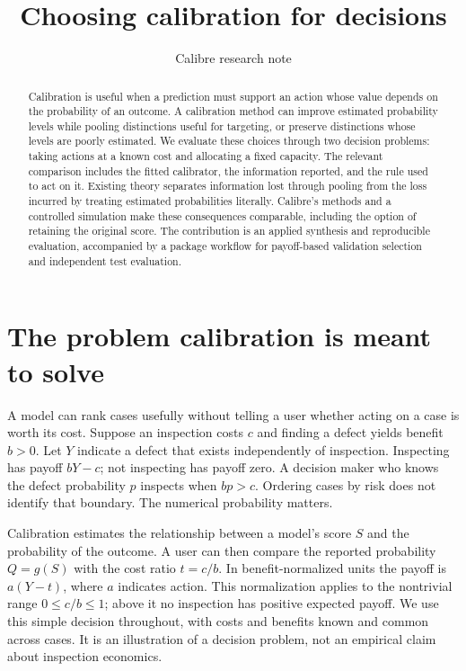 \documentclass[11pt]{article}
\title{Choosing calibration for decisions}
\author{Calibre research note}
\date{}
\begin{document}
\maketitle
\begin{abstract}
Calibration is useful when a prediction must support an action whose value depends on the probability of an outcome. A calibration method can improve estimated probability levels while pooling distinctions useful for targeting, or preserve distinctions whose levels are poorly estimated. We evaluate these choices through two decision problems: taking actions at a known cost and allocating a fixed capacity. The relevant comparison includes the fitted calibrator, the information reported, and the rule used to act on it. Existing theory separates information lost through pooling from the loss incurred by treating estimated probabilities literally. Calibre's methods and a controlled simulation make these consequences comparable, including the option of retaining the original score. The contribution is an applied synthesis and reproducible evaluation, accompanied by a package workflow for payoff-based validation selection and independent test evaluation.
\end{abstract}

\section{The problem calibration is meant to solve}
A model can rank cases usefully without telling a user whether acting on a case is worth its cost. Suppose an inspection costs $c$ and finding a defect yields benefit $b>0$. Let $Y$ indicate a defect that exists independently of inspection. Inspecting has payoff $bY-c$; not inspecting has payoff zero. A decision maker who knows the defect probability $p$ inspects when $bp>c$. Ordering cases by risk does not identify that boundary. The numerical probability matters.

Calibration estimates the relationship between a model's score $S$ and the probability of the outcome. A user can then compare the reported probability $Q=g(S)$ with the cost ratio $t=c/b$. In benefit-normalized units the payoff is $a(Y-t)$, where $a$ indicates action. This normalization applies to the nontrivial range $0\leq c/b\leq1$; above it no inspection has positive expected payoff. We use this simple decision throughout, with costs and benefits known and common across cases. It is an illustration of a decision problem, not an empirical claim about inspection economics.
\end{document}
